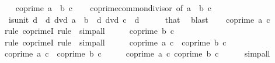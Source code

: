\begin{isabellebody}
%
\isadelimproof
%
\endisadelimproof
%
\isatagproof
{}\isamarkupfalse%
\isanewline
\ \ \isamarkupfalse%
\ {\isachardoublequoteopen}coprime\ {\isacharparenleft}{\kern0pt}a\ {\isacharasterisk}{\kern0pt}\ b{\isacharparenright}{\kern0pt}\ c{\isachardoublequoteclose}\isanewline
\ \ \isamarkupfalse%
\ coprime{\isacharunderscore}{\kern0pt}common{\isacharunderscore}{\kern0pt}divisor\ {\isacharbrackleft}{\kern0pt}of\ {\isachardoublequoteopen}a\ {\isacharasterisk}{\kern0pt}\ b{\isachardoublequoteclose}\ c{\isacharbrackright}{\kern0pt}\isanewline
\ \ \isamarkupfalse%
\ {\isacharasterisk}{\kern0pt}{\isacharcolon}{\kern0pt}\ {\isachardoublequoteopen}is{\isacharunderscore}{\kern0pt}unit\ d{\isachardoublequoteclose}\ \ {\isachardoublequoteopen}d\ dvd\ a\ {\isacharasterisk}{\kern0pt}\ b{\isachardoublequoteclose}\ \ {\isachardoublequoteopen}d\ dvd\ c{\isachardoublequoteclose}\ \ d\isanewline
\ \ \ \ \isamarkupfalse%
\ that\ \isamarkupfalse%
\ blast\isanewline
\ \ \isamarkupfalse%
\ {\isachardoublequoteopen}coprime\ a\ c{\isachardoublequoteclose}\isanewline
\ \ \ \ \isamarkupfalse%
\ {\isacharparenleft}{\kern0pt}rule\ coprimeI{\isacharcomma}{\kern0pt}\ rule\ {\isacharasterisk}{\kern0pt}{\isacharparenright}{\kern0pt}\ simp{\isacharunderscore}{\kern0pt}all\isanewline
\ \ \isamarkupfalse%
\ \isamarkupfalse%
\ {\isachardoublequoteopen}coprime\ b\ c{\isachardoublequoteclose}\isanewline
\ \ \ \ \isamarkupfalse%
\ {\isacharparenleft}{\kern0pt}rule\ coprimeI{\isacharcomma}{\kern0pt}\ rule\ {\isacharasterisk}{\kern0pt}{\isacharparenright}{\kern0pt}\ simp{\isacharunderscore}{\kern0pt}all\isanewline
\ \ \isamarkupfalse%
\ \isamarkupfalse%
\ {\isachardoublequoteopen}coprime\ a\ c\ {\isasymand}\ coprime\ b\ c{\isachardoublequoteclose}\ \isacommand{{\isachardot}{\kern0pt}{\isachardot}{\kern0pt}}\isamarkupfalse%
\isanewline
{}\isamarkupfalse%
\isanewline
\ \ \isamarkupfalse%
\ {\isachardoublequoteopen}coprime\ a\ c\ {\isasymand}\ coprime\ b\ c{\isachardoublequoteclose}\isanewline
\ \ \isamarkupfalse%
\ \isamarkupfalse%
\ {\isachardoublequoteopen}coprime\ a\ c{\isachardoublequoteclose}\ {\isachardoublequoteopen}coprime\ b\ c{\isachardoublequoteclose}\isanewline
\ \ \ \ \isamarkupfalse%
\ simp{\isacharunderscore}{\kern0pt}all\isanewline
\ \ \isamarkupfalse%

\end{isabellebody}
